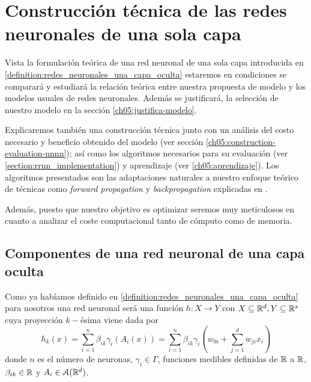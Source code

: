 %

\chapter{Construcción técnica de las redes neuronales de una sola capa}  
\label{chapter:construir-redes-neuronales}
Vista la formulación teórica de una red neuronal de una sola capa 
introducida en \ref{definition:redes_neuronales_una_capa_oculta} 
estaremos en condiciones 
se comparará y estudiará la relación teórica 
entre nuestra propuesta de modelo y los modelos usuales de redes neuronales. Además se justificará, 
la selección de nuestro modelo en la sección \ref{ch05:justifica-modelo}.

Explicaremos también una construcción técnica junto con un
análisis del costo necesario y beneficio obtenido del modelo (ver sección \ref{ch05:construction-evaluation-nnnn});
así como los algoritmos necesarios para su evaluación (ver \ref{section:rrnn_implementation}) y aprendizaje (ver \ref{ch05:aprendizaje}). Los algoritmos presentados son 
 las adaptaciones naturales a nuestro enfoque teórico de técnicas como 
\textit{forward propagation} y \textit{backpropagation } explicadas en \cite{BishopPaterRecognition}. 

Además, puesto que nuestro objetivo es optimizar seremos muy meticulosos en cuanto a analizar el 
coste computacional tanto de cómputo como de 
memoria.



\section{Componentes de una red neuronal de una capa oculta} 

Como ya habíamos definido en \ref{definition:redes_neuronales_una_capa_oculta}  
para nosotros una red neuronal será  una función $h : X \longrightarrow Y$ con $X \subseteq \mathbb{R}^d, Y \subseteq \mathbb{R}^s$ 
cuya proyección $k-$ésima viene dada por
\begin{equation}
    h_k(x) =  \sum_{i=1}^{n} \beta_{i k} \gamma_{i}( A_{i}(x))
    = 
    \sum_{i=1}^{n} \beta_{i k} \gamma_{i}
    \left(
        w_{0 i} + \sum_{j=1}^d w_{j i } x_i
    \right) 
\end{equation}
donde $n$ es el número de neuronas,   $\gamma_{i} \in \Gamma$, funciones medibles definidas de $\mathbb{R}$ a $\mathbb{R}$,
$\beta_{i k} \in \mathbb{R}$ y $A_i \in \mathcal{A}(\mathbb{R}^d)$.

